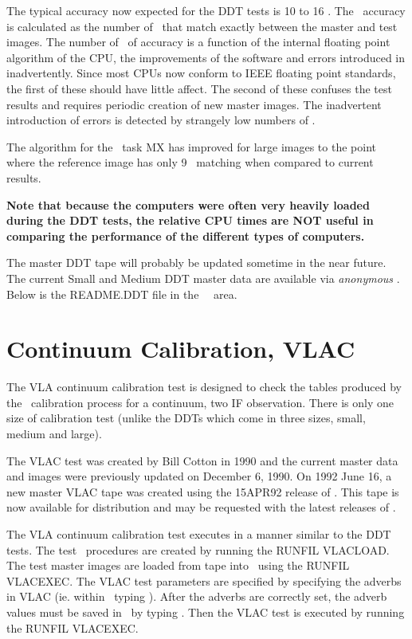 The typical accuracy now expected for the DDT tests is 10 to 16 \bits.
The \AIPS\ accuracy is calculated as the number of \bits\ that
match exactly between the master and test images.
The number of \bits\ of accuracy is a function of the internal
floating point algorithm of the CPU, the improvements
of the software and errors introduced in inadvertently.
Since most CPUs now conform to IEEE floating point standards,
the first of these should have little affect.
The second of these confuses the test results and requires
periodic creation of new master images.
The inadvertent introduction of errors is detected by strangely
low numbers of \bits.

The algorithm for the \AIPS\ task MX has improved for large
images to the point where the reference image has only 9 \bits\
matching when compared to current results.

{\bf Note that because the computers were often very heavily loaded during
the DDT tests, the relative CPU times are NOT useful in comparing
the performance of the different types of computers.}

The master DDT tape will probably be updated sometime in the
near future. The current Small and Medium DDT master data are
available via {\it anonymous} \ftp. Below is the README.DDT file
in the \baboon\ \ftp\ area.

\vskip 1in



\clearpage
\section{Continuum Calibration, VLAC}
The VLA continuum calibration test is designed to check the tables
produced by the \AIPS\ calibration process for a continuum, two IF
observation.
There is only one size of calibration test (unlike the DDTs which
come in three sizes, small, medium and large).

The VLAC test was created by Bill Cotton in 1990 and the current master
data and images were previously updated on December 6, 1990.
On 1992 June 16, a new master VLAC tape was created using the 15APR92
release of \AIPS.  This tape is now available for distribution and
may be requested with the latest releases of \AIPS.

The VLA continuum calibration test executes in a manner
similar to the DDT tests.
The test \AIPS\ procedures are created by running the RUNFIL VLACLOAD.
The test master images are loaded from tape into \AIPS\ using the
RUNFIL VLACEXEC.
The VLAC test parameters are specified by specifying the adverbs
in VLAC (ie. within \AIPS\ typing \APEIN{INPUT VLAC}).
After the adverbs are correctly set, the adverb values must be
saved in \AIPS\ by typing .
Then the VLAC test is executed by running the RUNFIL VLACEXEC.

